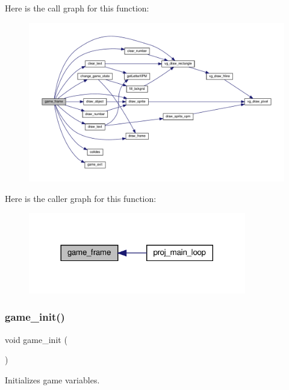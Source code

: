 Here is the call graph for this function\+:\nopagebreak
\begin{figure}[H]
\begin{center}
\leavevmode
\includegraphics[width=350pt]{group__Game_gad1af7212c4703893c625ad5a5e9107e0_cgraph}
\end{center}
\end{figure}
Here is the caller graph for this function\+:\nopagebreak
\begin{figure}[H]
\begin{center}
\leavevmode
\includegraphics[width=269pt]{group__Game_gad1af7212c4703893c625ad5a5e9107e0_icgraph}
\end{center}
\end{figure}
\mbox{\label{group__Game_ga5f5ccbe5abfdef24c8378dc3cf32ffb3}} 
\subsubsection{\texorpdfstring{game\+\_\+init()}{game\_init()}}
{\footnotesize\ttfamily void game\+\_\+init (\begin{DoxyParamCaption}{ }\end{DoxyParamCaption})}



Initializes game variables. 

